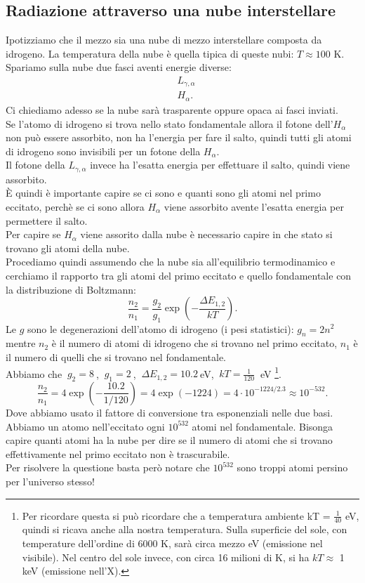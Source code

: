 \subsection{Radiazione attraverso una nube interstellare}%
Ipotizziamo che il mezzo sia una nube di mezzo interstellare composta da idrogeno. La temperatura della nube è quella tipica di queste nubi: $T \approx 100$ K. Spariamo sulla nube due fasci aventi energie diverse:
\begin{align}
	&L_{\gamma,\alpha} \\
	&H_{\alpha}
.\end{align}
Ci chiediamo adesso se la nube sarà trasparente oppure opaca ai fasci inviati.\\
Se l'atomo di idrogeno si trova nello stato fondamentale allora il fotone dell'$H_{\alpha}$ non può essere assorbito, non ha l'energia per fare il salto, quindi tutti gli atomi di idrogeno sono invisibili per un fotone della $H_{\alpha}$. \\
Il fotone della $L_{\gamma,\alpha}$ invece ha l'esatta energia per effettuare il salto, quindi viene assorbito. \\
È quindi è importante capire se ci sono e quanti sono gli atomi nel primo eccitato, perchè se ci sono allora $H_{\alpha}$ viene assorbito avente l'esatta energia per permettere il salto. \\
Per capire se $H_{\alpha }$ viene assorito dalla nube è necessario capire in che stato si trovano gli atomi della nube.\\
Procediamo quindi assumendo che la nube sia all'equilibrio termodinamico e cerchiamo il rapporto tra gli atomi del primo eccitato e quello fondamentale con la distribuzione di Boltzmann:
\[
	\frac{n_2}{n_1} = \frac{g_2}{g_1}\exp\left( -\frac{\Delta E_{1,2}}{kT} \right) 
.\] 
Le $g$ sono le degenerazioni dell'atomo di idrogeno (i pesi statistici): $g_{n}= 2 n^2$ mentre $n_2$ è il numero di atomi di idrogeno che si trovano nel primo eccitato, $n_1$ è il numero di quelli che si trovano nel fondamentale. \\
Abbiamo che $ \ g_2 = 8 \ $, $ \ g_1 = 2 \ $,  $ \ \Delta E _{1,2}= 10.2 \ $eV, $ \ kT =\frac{1}{120} \ $ eV \footnote{Per ricordare questa si può ricordare che a temperatura ambiente kT = $\frac{1}{40}$ eV, quindi si ricava anche alla nostra temperatura. Sulla superficie del sole, con temperature dell'ordine di 6000 K, sarà circa mezzo eV (emissione nel visibile). Nel centro del sole invece, con circa 16 milioni di K, si ha $kT \approx$ 1 keV (emissione nell'X).}.\\
\[
	\frac{n_2}{n_1} = 4 \exp\left( - \frac{10.2}{1 / 120} \right)  = 4 \exp\left( -1224 \right) = 4\cdot 10^{-1224 /2.3} \approx 10^{-532}
.\] 
Dove abbiamo usato il fattore di conversione tra esponenziali nelle due basi.\\
Abbiamo un atomo nell'eccitato ogni $10^{532}$ atomi nel fondamentale. Bisonga capire quanti atomi ha la nube per dire se il numero di atomi che si trovano effettivamente nel primo eccitato non è trascurabile. \\
Per risolvere la questione basta però notare che $10^{532}$ sono troppi atomi persino per l'universo stesso!
